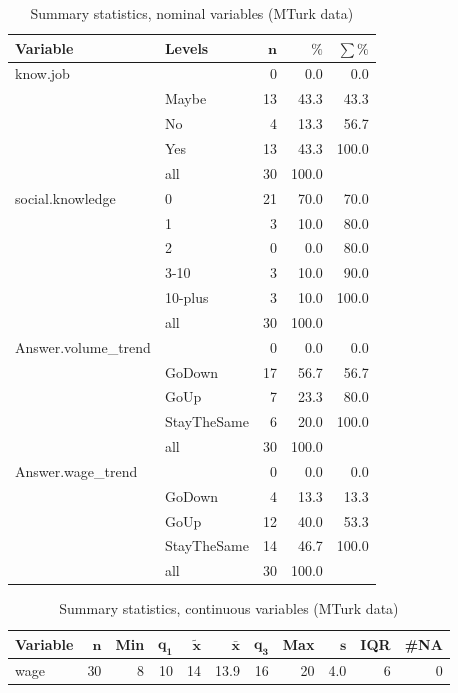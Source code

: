 \documentclass[a4paper,10pt]{article}\usepackage[]{graphicx}\usepackage[]{color}
\begin{document}
\begin{table}[ht]
\centering
{\footnotesize
\begin{tabular}{ll|rrr}
 \textbf{Variable} & \textbf{Levels} & $\mathbf{n}$ & $\mathbf{\%}$ & $\mathbf{\sum \%}$ \\ 
  \hline
know.job &  & 0 & 0.0 & 0.0 \\ 
   & Maybe & 13 & 43.3 & 43.3 \\ 
   & No & 4 & 13.3 & 56.7 \\ 
   & Yes & 13 & 43.3 & 100.0 \\ 
   \hline
 & all & 30 & 100.0 &  \\ 
   \hline
\hline
social.knowledge & 0 & 21 & 70.0 & 70.0 \\ 
   & 1 & 3 & 10.0 & 80.0 \\ 
   & 2 & 0 & 0.0 & 80.0 \\ 
   & 3-10 & 3 & 10.0 & 90.0 \\ 
   & 10-plus & 3 & 10.0 & 100.0 \\ 
   \hline
 & all & 30 & 100.0 &  \\ 
   \hline
\hline
Answer.volume\_trend &  & 0 & 0.0 & 0.0 \\ 
   & GoDown & 17 & 56.7 & 56.7 \\ 
   & GoUp & 7 & 23.3 & 80.0 \\ 
   & StayTheSame & 6 & 20.0 & 100.0 \\ 
   \hline
 & all & 30 & 100.0 &  \\ 
   \hline
\hline
Answer.wage\_trend &  & 0 & 0.0 & 0.0 \\ 
   & GoDown & 4 & 13.3 & 13.3 \\ 
   & GoUp & 12 & 40.0 & 53.3 \\ 
   & StayTheSame & 14 & 46.7 & 100.0 \\ 
   \hline
 & all & 30 & 100.0 &  \\ 
   \hline
\hline
\end{tabular}
}
\caption{Summary statistics, nominal variables (MTurk data)} 
\label{tab1:51-2090}
\end{table}
\begin{table}[ht]
\centering
{\footnotesize
\begin{tabular}{lrrrrrrrrrr}
 \textbf{Variable} & $\mathbf{n}$ & \textbf{Min} & $\mathbf{q_1}$ & $\mathbf{\widetilde{x}}$ & $\mathbf{\bar{x}}$ & $\mathbf{q_3}$ & \textbf{Max} & $\mathbf{s}$ & \textbf{IQR} & \textbf{\#NA} \\ 
  \hline
wage & 30 & 8 & 10 & 14 & 13.9 & 16 & 20 & 4.0 & 6 & 0 \\ 
  \end{tabular}
}
\caption{Summary statistics, continuous variables (MTurk data)} 
\label{tab2:51-2090}
\end{table}
\end{document}

